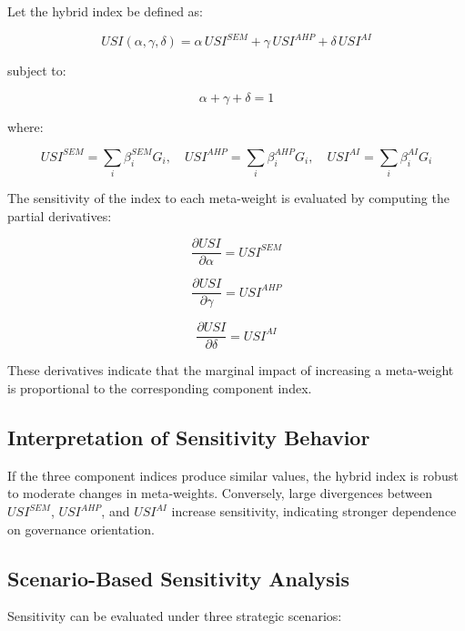 \documentclass[11pt,a4paper]{article}
\begin{document}
Let the hybrid index be defined as:

\begin{equation}
USI(\alpha, \gamma, \delta)
=
\alpha \, USI^{SEM}
+
\gamma \, USI^{AHP}
+
\delta \, USI^{AI}
\end{equation}

subject to:

\begin{equation}
\alpha + \gamma + \delta = 1
\end{equation}

where:

\[
USI^{SEM} = \sum_i \beta_i^{SEM} G_i,
\quad
USI^{AHP} = \sum_i \beta_i^{AHP} G_i,
\quad
USI^{AI} = \sum_i \beta_i^{AI} G_i
\]

The sensitivity of the index to each meta-weight is evaluated by 
computing the partial derivatives:

\begin{equation}
\frac{\partial USI}{\partial \alpha} = USI^{SEM}
\end{equation}

\begin{equation}
\frac{\partial USI}{\partial \gamma} = USI^{AHP}
\end{equation}

\begin{equation}
\frac{\partial USI}{\partial \delta} = USI^{AI}
\end{equation}

These derivatives indicate that the marginal impact of increasing a 
meta-weight is proportional to the corresponding component index.

\subsection{Interpretation of Sensitivity Behavior}

If the three component indices produce similar values, the hybrid index 
is robust to moderate changes in meta-weights. Conversely, large 
divergences between $USI^{SEM}$, $USI^{AHP}$, and $USI^{AI}$ increase 
sensitivity, indicating stronger dependence on governance orientation.

\subsection{Scenario-Based Sensitivity Analysis}

Sensitivity can be evaluated under three strategic scenarios:
\end{document}
